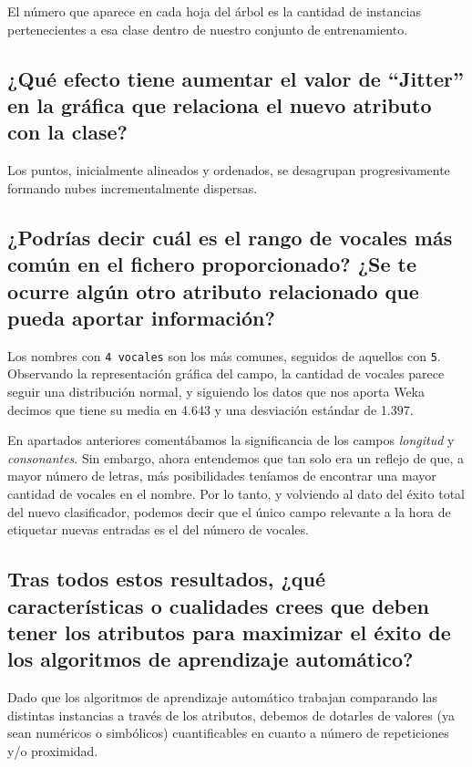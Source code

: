 \documentclass[12pt]{article}
\begin{document}
El número que aparece en cada hoja del árbol es la cantidad de instancias
pertenecientes a esa clase dentro de nuestro conjunto de entrenamiento.

\subsection*{\small ¿Qué efecto tiene aumentar el valor de ``Jitter'' en la
gráfica que relaciona el nuevo atributo con la clase?}

Los puntos, inicialmente alineados y ordenados, se desagrupan progresivamente
formando nubes incrementalmente dispersas.

\subsection*{\small ¿Podrías decir cuál es el rango de vocales más común en el
fichero proporcionado? ¿Se te ocurre algún otro atributo relacionado que pueda
aportar información?}

Los nombres con \texttt{4 vocales} son los más comunes, seguidos de aquellos
con \texttt{5}. Observando la representación gráfica del campo, la cantidad de
vocales parece seguir una distribución normal, y siguiendo los datos que nos
aporta Weka decimos que tiene su media en 4.643 y una desviación estándar de
1.397.

En apartados anteriores comentábamos la significancia de los campos
\emph{longitud} y \emph{consonantes}. Sin embargo, ahora entendemos que tan solo
era un reflejo de que, a mayor número de letras, más posibilidades teníamos de
encontrar una mayor cantidad de vocales en el nombre. Por lo tanto, y volviendo
al dato del éxito total del nuevo clasificador, podemos decir que el único campo
relevante a la hora de etiquetar nuevas entradas es el del número de vocales.

\subsection*{\small Tras todos estos resultados, ¿qué características o
cualidades crees que deben tener los atributos para maximizar el éxito de los
algoritmos de aprendizaje automático?}

Dado que los algoritmos de aprendizaje automático trabajan comparando las
distintas instancias a través de los atributos, debemos de dotarles de valores
(ya sean numéricos o simbólicos) cuantificables en cuanto a número de
repeticiones y/o proximidad.
\end{document}
